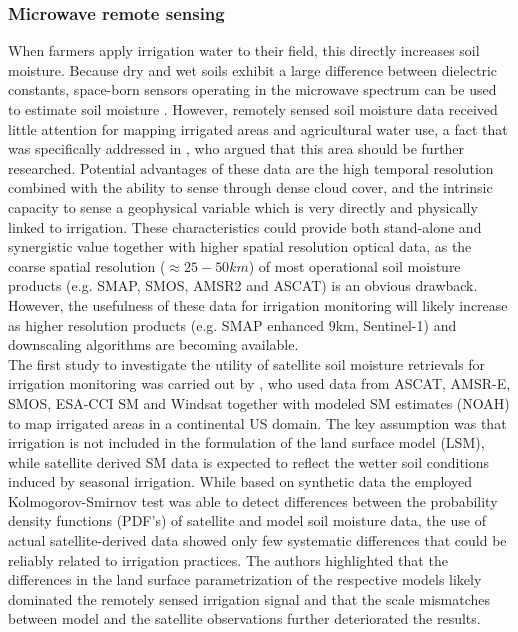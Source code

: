 \documentclass[hess, manuscript]{copernicus}
\begin{document}
\subsubsection{Microwave remote sensing}
When farmers apply irrigation water to their field, this directly increases soil moisture. Because dry and wet soils exhibit a large difference between dielectric constants, space-born sensors operating in the microwave spectrum can be used to estimate soil moisture \citep{wagner2013ascat,wagner1999method,entekhabi2010soil}. However, remotely sensed soil moisture data received little attention for mapping irrigated areas and agricultural water use, a fact that was specifically addressed in \citet{Ozdogan_2010_2}, who argued that this area should be further researched. Potential advantages of these data are the high temporal resolution combined with the ability to sense through dense cloud cover, and the intrinsic capacity to sense a geophysical variable which is very directly and physically linked to irrigation. These characteristics could provide both stand-alone and synergistic value together with higher spatial resolution optical data, as the coarse spatial resolution ($\approx 25 - 50 km$) of most operational soil moisture products (e.g. SMAP, SMOS, AMSR2 and ASCAT) is an obvious drawback. However, the usefulness of these data for irrigation monitoring will likely increase as higher resolution products (e.g. SMAP enhanced 9km, Sentinel-1) \citep{Hornacek2012} and downscaling algorithms \citep{escorihuela2016comparison} are becoming available.\\

The first study to investigate the utility of satellite soil moisture retrievals for irrigation monitoring was carried out by \citet{Kumar_2015}, who used data from ASCAT, AMSR-E, SMOS, ESA-CCI SM and Windsat together with modeled SM estimates (NOAH) to map irrigated areas in a continental US domain. The key assumption was that irrigation is not included in the formulation of the land surface model (LSM), while satellite derived SM data is expected to reflect the wetter soil conditions induced by seasonal irrigation. While based on synthetic data the employed Kolmogorov-Smirnov test was able to detect differences between the probability density functions (PDF's) of satellite and model soil moisture data, the use of actual satellite-derived data showed only few systematic differences that could be reliably related to irrigation practices. The authors highlighted that the differences in the land surface parametrization of the respective models likely dominated the remotely sensed irrigation signal and that the scale mismatches between model and the satellite observations further deteriorated the results.\\
\end{document}
